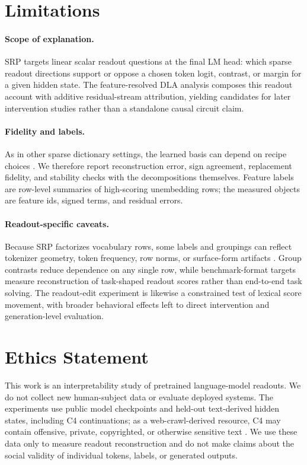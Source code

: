 \section*{Limitations}

\paragraph{Scope of explanation.}
SRP targets linear scalar readout questions at the final LM head: which sparse
readout directions support or oppose a chosen token logit, contrast, or margin
for a given hidden state. The feature-resolved DLA analysis composes this
readout account with additive residual-stream attribution, yielding candidates
for later intervention studies rather than a standalone causal circuit claim.

\paragraph{Fidelity and labels.}
As in other sparse dictionary settings, the learned basis can depend on recipe
choices
\citep{elhage2022superposition,karvonen2025saebench,makelov2024principled}. We
therefore report reconstruction error, sign agreement, replacement fidelity, and
stability checks with the decompositions themselves. Feature labels are
row-level summaries of high-scoring unembedding rows; the measured objects are
feature ids, signed terms, and residual errors.

\paragraph{Readout-specific caveats.}
Because SRP factorizes vocabulary rows, some labels and groupings can reflect
tokenizer geometry, token frequency, row norms, or surface-form artifacts
\citep{press2017outputembedding,inan2017tying,yang2018softmaxbottleneck,bostrom2020bpe}.
Group contrasts reduce dependence on any single row, while benchmark-format
targets measure reconstruction of task-shaped readout scores rather than
end-to-end task solving. The readout-edit experiment is likewise a constrained
test of lexical score movement, with broader behavioral effects left to direct
intervention and generation-level evaluation.

\section*{Ethics Statement}

This work is an interpretability study of pretrained language-model readouts. We
do not collect new human-subject data or evaluate deployed systems. The
experiments use public model checkpoints and held-out text-derived hidden states,
including C4 continuations; as a web-crawl-derived resource, C4 may contain
offensive, private, copyrighted, or otherwise sensitive text
\citep{raffel2020exploring,dodge2021documenting}. We use these data only to
measure readout reconstruction and do not make claims about the social validity
of individual tokens, labels, or generated outputs.

